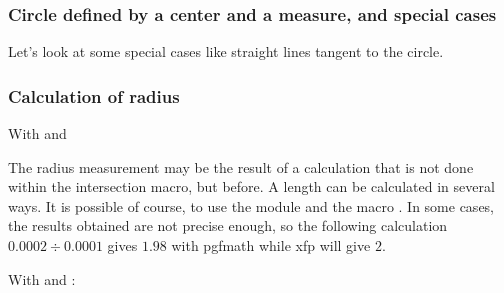 \subsubsection{Circle defined by a center and a measure, and special cases}
Let's look at some special cases like straight lines tangent to the circle.

\begin{tkzexample}[latex=7cm,small]

\end{tkzexample}

\subsubsection{Calculation of radius}
 With  and 

The radius measurement may be the result of a calculation that is not done within the intersection macro, but before.
A length can be calculated in several ways. It is possible of course,
 to use the module  and the macro . In some cases, the results obtained are not precise enough, so the following calculation $0.0002 \div 0.0001$ gives $1.98$ with pgfmath while xfp will give $2$. 

With  and :

\begin{tkzexample}[latex=7cm,small]
  \end{tkzexample}


